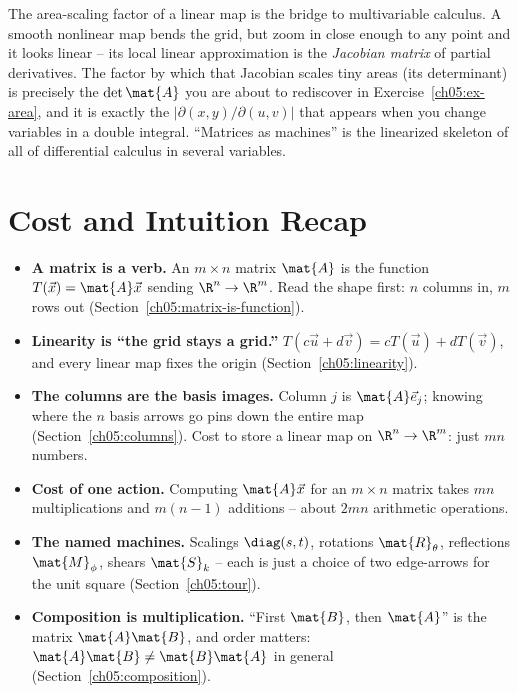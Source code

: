 \begin{connectionbox}
The area-scaling factor of a linear map is the bridge to multivariable calculus.
A smooth nonlinear map bends the grid, but zoom in close enough to any point and
it looks linear -- its local linear approximation is the \emph{Jacobian matrix} of
partial derivatives. The factor by which that Jacobian scales tiny areas (its
determinant) is precisely the $\det\mat{A}$ you are about to rediscover in
Exercise~\ref{ch05:ex-area}, and it is exactly the $\lvert\partial(x,y)/\partial(u,v)\rvert$
that appears when you change variables in a double integral. ``Matrices as
machines'' is the linearized skeleton of all of differential calculus in several
variables.
\end{connectionbox}

\section{Cost and Intuition Recap}
\label{ch05:recap}

\begin{itemize}
\item \textbf{A matrix is a verb.} An $m\times n$ matrix $\mat{A}$ is the function
  $T(\vec{x})=\mat{A}\vec{x}$ sending $\R^n\to\R^m$. Read the shape first: $n$
  columns in, $m$ rows out (Section~\ref{ch05:matrix-is-function}).
\item \textbf{Linearity is ``the grid stays a grid.''} $T(c\vec{u}+d\vec{v}) =
  cT(\vec{u})+dT(\vec{v})$, and every linear map fixes the origin
  (Section~\ref{ch05:linearity}).
\item \textbf{The columns are the basis images.} Column $j$ is $\mat{A}\vec{e}_j$;
  knowing where the $n$ basis arrows go pins down the entire map
  (Section~\ref{ch05:columns}). Cost to store a linear map on $\R^n\to\R^m$: just
  $mn$ numbers.
\item \textbf{Cost of one action.} Computing $\mat{A}\vec{x}$ for an $m\times n$
  matrix takes $mn$ multiplications and $m(n-1)$ additions -- about $2mn$
  arithmetic operations.
\item \textbf{The named machines.} Scalings $\diag(s,t)$, rotations
  $\mat{R}_\theta$, reflections $\mat{M}_\phi$, shears $\mat{S}_k$ -- each is just
  a choice of two edge-arrows for the unit square (Section~\ref{ch05:tour}).
\item \textbf{Composition is multiplication.} ``First $\mat{B}$, then $\mat{A}$''
  is the matrix $\mat{A}\mat{B}$, and order matters:
  $\mat{A}\mat{B}\neq\mat{B}\mat{A}$ in general (Section~\ref{ch05:composition}).
\end{itemize}

